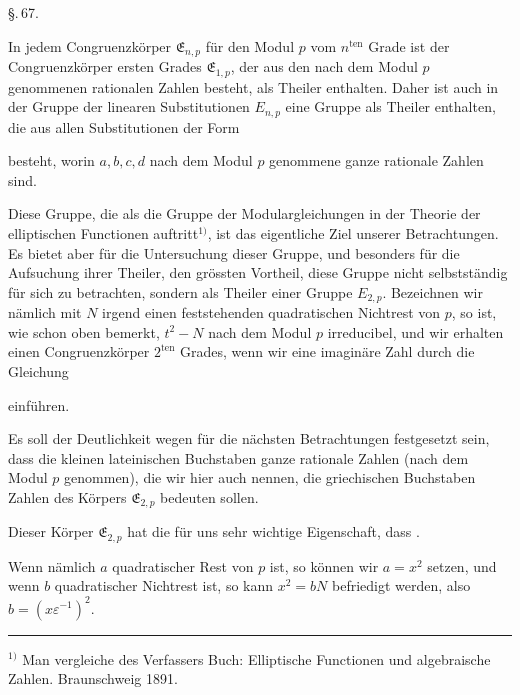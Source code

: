 
\begin{center}
\S.\,67.

\end{center}

In jedem Congruenzkörper $\mathfrak{E}_{n,p}$ für den Modul $p$ vom $n^{\mathrm{ten}}$
Grade ist der Congruenzkörper ersten Grades $\mathfrak{E}_{1,p}$, der aus den
nach dem Modul $p$ genommenen rationalen Zahlen besteht, als
Theiler enthalten. Daher ist auch in der Gruppe der linearen
Substitutionen $E_{n,p}$ eine Gruppe als Theiler enthalten, die aus
allen Substitutionen der Form

besteht, worin $a, b, c, d$ nach dem Modul $p$ genommene ganze
rationale Zahlen sind.

Diese Gruppe, die als die Gruppe der Modulargleichungen
in der Theorie der elliptischen Functionen auftritt$^{1)}$, ist das
eigentliche Ziel unserer Betrachtungen. Es bietet aber für die
Untersuchung dieser Gruppe, und besonders für die Aufsuchung
ihrer Theiler, den grössten Vortheil, diese Gruppe nicht selbstständig
für sich zu betrachten, sondern als Theiler einer
Gruppe $E_{2,p}$. Bezeichnen wir nämlich mit $N$ irgend einen feststehenden
quadratischen Nichtrest von $p$, so ist, wie schon oben
bemerkt, $t^2-N$ nach dem Modul $p$ irreducibel, und wir erhalten
einen Congruenzkörper $2^{\mathrm{ten}}$ Grades, wenn wir eine
 imaginäre Zahl durch die Gleichung

einführen.

Es soll der Deutlichkeit wegen für die nächsten Betrachtungen
festgesetzt sein, dass die kleinen lateinischen Buchstaben
ganze rationale Zahlen (nach dem Modul $p$ genommen), die wir
hier auch  nennen, die griechischen Buchstaben
Zahlen des Körpers $\mathfrak{E}_{2,p}$ bedeuten sollen.

Dieser Körper $\mathfrak{E}_{2,p}$ hat die für uns sehr wichtige Eigenschaft,
dass .

Wenn nämlich $a$ quadratischer Rest von $p$ ist, so können
wir $a=x^2$ setzen, und wenn $b$ quadratischer Nichtrest ist, so
kann $x^2=bN$ befriedigt werden, also $b=(x\varepsilon^{-1})^2$.

\rule{4cm}{0.4pt}

$^{1)}$ Man vergleiche des Verfassers Buch: \glqq Elliptische Functionen und
algebraische Zahlen\grqq{}. Braunschweig 1891.
